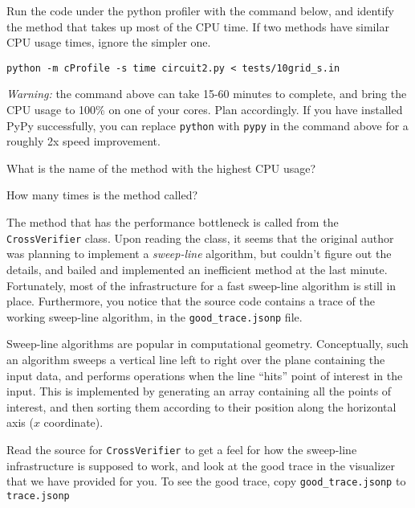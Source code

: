 \documentclass[12pt,twoside]{article}
\begin{document}
\begin{problems}
\begin{problemparts}
\problempart {} Run the code under the python profiler with the command
below, and identify the method that takes up most of the CPU time. If two
methods have similar CPU usage times, ignore the simpler one.

\texttt{python -m cProfile -s time circuit2.py < tests/10grid\_s.in}

\textit{Warning:} the command above can take 15-60 minutes to complete, and
bring the CPU usage to 100\% on one of your cores. Plan accordingly. If
you have installed PyPy successfully, you can replace \texttt{python} with
\texttt{pypy} in the command above for a roughly 2x speed improvement. 

What is the name of the method with the highest CPU usage?

\problempart {} How many times is the method called?
\end{problemparts}

The method that has the performance bottleneck is called from the
\texttt{CrossVerifier} class. Upon reading the class, it seems that the original
author was planning to implement a \textit{sweep-line} algorithm, but
couldn't figure out the details, and bailed and implemented an inefficient
method at the last minute. Fortunately, most of the infrastructure for a fast
sweep-line algorithm is still in place. Furthermore, you notice that the
source code contains a trace of the working sweep-line algorithm, in the
\texttt{good\_trace.jsonp} file.

Sweep-line algorithms are popular in computational geometry. Conceptually,
such an algorithm sweeps a vertical line left to right over the plane containing
the input data, and performs operations when the line ``hits'' point of interest
in the input. This is implemented by generating an array containing all the
points of interest, and then sorting them according to their position along the
horizontal axis ($x$ coordinate).

Read the source for \texttt{CrossVerifier} to get a feel for how the sweep-line
infrastructure is supposed to work, and look at the good trace in the
visualizer that we have provided for you. To see the good trace, copy
\texttt{good\_trace.jsonp} to \texttt{trace.jsonp}


\end{problems}
\end{document}
